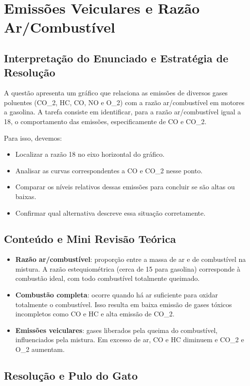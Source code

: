 \documentclass{article}
\begin{document}
\section*{Emissões Veiculares e Razão Ar/Combustível}

\subsection*{Interpretação do Enunciado e Estratégia de Resolução}
A questão apresenta um gráfico que relaciona as emissões de diversos gases poluentes (CO_2, HC, CO, NO e O_2) com a razão ar/combustível em motores a gasolina. A tarefa consiste em identificar, para a razão ar/combustível igual a 18, o comportamento das emissões, especificamente de CO e CO_2.

Para isso, devemos:
\begin{itemize}
  \item Localizar a razão 18 no eixo horizontal do gráfico.
  \item Analisar as curvas correspondentes a CO e CO_2 nesse ponto.
  \item Comparar os níveis relativos dessas emissões para concluir se são altas ou baixas.
  \item Confirmar qual alternativa descreve essa situação corretamente.
\end{itemize}

\subsection*{Conteúdo e Mini Revisão Teórica}
\begin{itemize}
  \item \textbf{Razão ar/combustível}: proporção entre a massa de ar e de combustível na mistura. A razão estequiométrica (cerca de 15 para gasolina) corresponde à combustão ideal, com todo combustível totalmente queimado.

  \item \textbf{Combustão completa}: ocorre quando há ar suficiente para oxidar totalmente o combustível. Isso resulta em baixa emissão de gases tóxicos incompletos como CO e HC e alta emissão de CO_2.

  \item \textbf{Emissões veiculares}: gases liberados pela queima do combustível, influenciados pela mistura. Em excesso de ar, CO e HC diminuem e CO_2 e O_2 aumentam.
\end{itemize}

\subsection*{Resolução e Pulo do Gato}
\end{document}
